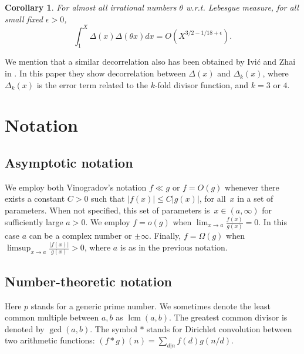 \documentclass[a4paper,12pt, reqn0]{amsart}
\newtheorem{corollary}{Corollary}[section]
\theoremstyle{remark}
\DeclareMathOperator{\lcm}{lcm}
\begin{document}
\begin{corollary} For almost all irrational numbers $\theta$ w.r.t. Lebesgue measure, for all small fixed $\epsilon>0$,
$$\int_{1}^X\Delta(x)\Delta(\theta x)dx=O(X^{3/2-1/18+\epsilon}).$$
\end{corollary}

We mention that a similar decorrelation also has been
obtained by Ivi\'c and Zhai in \cite{ivic}. In this paper they show
decorrelation between $\Delta(x)$ and $\Delta_k(x)$, where
$\Delta_k(x)$ is the error term related to the $k$-fold divisor
function, and $k=3$ or $4$.

\section{Notation}
\subsection{Asymptotic notation} We employ both Vinogradov's notation
$f\ll g$ or $f=O(g)$ whenever there exists a constant $C>0$ such that
$|f(x)|\leq C|g(x)|$, for all~$x$ in a set of parameters. When not
specified, this set of parameters is~$x\in (a,\infty)$ for
sufficiently large $a>0$. We employ $f=o(g)$ when
$\lim_{x\to a} \frac{f(x)}{g(x)}=0$. In this case $a$ can be a complex
number or $\pm\infty$. Finally, $f=\Omega(g)$ when
$\limsup_{x\to a}\frac{|f(x)|}{g(x)}>0$, where $a$ is as in the
previous notation.
\subsection{Number-theoretic notation} Here $p$ stands for a generic
prime number. We sometimes denote the least common multiple between
$a,b$ as $\lcm(a,b)$. The greatest common divisor is denoted by
$\gcd(a,b)$. The symbol $\ast$ stands for Dirichlet convolution between two arithmetic functions: $(f\ast g)(n)=\sum_{d|n}f(d)g(n/d)$.

\end{document}
